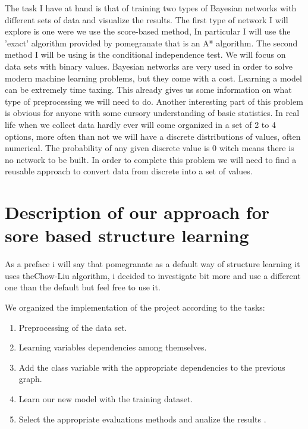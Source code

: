 \documentclass{article} %
\begin{document}
 The task I have at hand is that of training two types of Bayesian networks with different sets of data and visualize the results. The first type of network I will explore is one were we use the score-based method, In particular I will use the 'exact' algorithm provided by pomegranate that is an A* algorithm. The second method I will be using is the conditional independence test. We will focus on data sets with binary values.
\bigskip
Bayesian networks are very used in order to solve modern machine learning problems, but they come with a cost. Learning a model can be extremely time taxing. This already gives us some information on what type of preprocessing we will need to do.
\bigskip
Another interesting part of this problem is obvious for anyone with some cursory understanding of basic statistics. In real life when we collect data hardly ever will come organized in a set of 2 to 4 options, more often than not we will have a discrete distributions of values, often numerical. The probability of any given discrete value is 0 witch means there is no network to be built. In order to complete this problem we will need to find a reusable approach to convert data from discrete into a set of values.
\bigskip
\section{Description of our approach for sore based structure learning}
  
 As a preface i will say that pomegranate as a default way of structure learning it uses theChow-Liu algorithm, i decided to investigate bit more and use a different one than the default but feel free to use it.
\bigskip

We organized the implementation of the project according to the tasks:
\begin{enumerate} 
 \item Preprocessing of the data set.
 
 \item Learning variables dependencies among themselves.
 
 \item Add the class variable with the appropriate dependencies to the previous graph.
 \item  Learn our new model with the training dataset.  
 
  \item  Select the appropriate evaluations methods and analize the results . 
\end{enumerate} 
\end{document}
